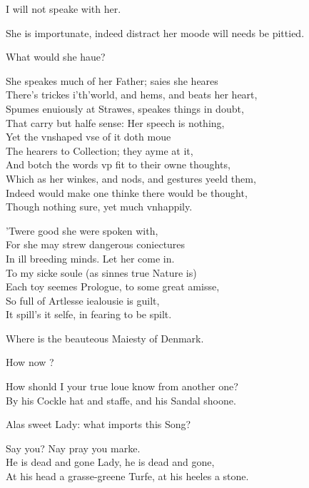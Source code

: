 \documentclass[a5paper,DIV=calc,11pt]{scrbook}
\begin{document}
\begin{drama*}
    \queenspeaks I will not speake with her.
    
    \horspeaks She is importunate, indeed distract her moode will needs be pittied.
    
    \queenspeaks What would she haue?
    
    \horspeaks She speakes much of her Father; saies she heares\\
    There's trickes i'th'world, and hems, and beats her heart,\\
    Spumes enuiously at Strawes, speakes things in doubt,\\
    That carry but halfe sense: Her speech is nothing,\\
    Yet the vnshaped vse of it doth moue\\
    The hearers to Collection; they ayme at it,\\
    And botch the words vp fit to their owne thoughts,\\
    Which as her winkes, and nods, and gestures yeeld them,\\
    Indeed would make one thinke there would be thought,\\
    Though nothing sure, yet much vnhappily.
    
    \queenspeaks 'Twere good she were spoken with,\\
    For she may strew dangerous coniectures\\
    In ill breeding minds. Let her come in.\\
    To my sicke soule (as sinnes true Nature is)\\
    Each toy seemes Prologue, to some great amisse,\\
    So full of Artlesse iealousie is guilt,\\
    It spill's it selfe, in fearing to be spilt.
    
    
    \ophespeaks Where is the beauteous Maiesty of Denmark.
    
    \queenspeaks How now \ophe?
    
    \ophespeaks How shonld I your true loue know from another one?\\
    By his Cockle hat and staffe, and his Sandal shoone.
    
    \queenspeaks Alas sweet Lady: what imports this Song?
    
    \ophespeaks Say you? Nay pray you marke.\\
    He is dead and gone Lady, he is dead and gone,\\
    At his head a grasse-greene Turfe, at his heeles a stone.
    

\end{drama*}
\end{document}
